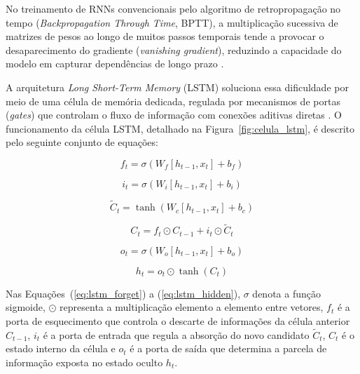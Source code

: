 No treinamento de RNNs convencionais pelo algoritmo de retropropagação no tempo (\textit{Backpropagation Through Time}, BPTT), a multiplicação sucessiva de matrizes de pesos ao longo de muitos passos temporais tende a provocar o desaparecimento do gradiente (\textit{vanishing gradient}), reduzindo a capacidade do modelo em capturar dependências de longo prazo \cite{hochreiter1997long}.

A arquitetura \textit{Long Short-Term Memory} (LSTM) soluciona essa dificuldade por meio de uma célula de memória dedicada, regulada por mecanismos de portas (\textit{gates}) que controlam o fluxo de informação com conexões aditivas diretas \cite{hochreiter1997long}. O funcionamento da célula LSTM, detalhado na Figura~\ref{fig:celula_lstm}, é descrito pelo seguinte conjunto de equações:

\begin{equation}\label{eq:lstm_forget}
f_t = \sigma\left(W_f [h_{t-1}, x_t] + b_f\right)
\end{equation}

\begin{equation}\label{eq:lstm_input}
i_t = \sigma\left(W_i [h_{t-1}, x_t] + b_i\right)
\end{equation}

\begin{equation}\label{eq:lstm_candidate}
\tilde{C}_t = \tanh\left(W_c [h_{t-1}, x_t] + b_c\right)
\end{equation}

\begin{equation}\label{eq:lstm_cell}
C_t = f_t \odot C_{t-1} + i_t \odot \tilde{C}_t
\end{equation}

\begin{equation}\label{eq:lstm_output}
o_t = \sigma\left(W_o [h_{t-1}, x_t] + b_o\right)
\end{equation}

\begin{equation}\label{eq:lstm_hidden}
h_t = o_t \odot \tanh(C_t)
\end{equation}

Nas Equações~(\ref{eq:lstm_forget}) a (\ref{eq:lstm_hidden}), $\sigma$ denota a função sigmoide, $\odot$ representa a multiplicação elemento a elemento entre vetores, $f_t$ é a porta de esquecimento que controla o descarte de informações da célula anterior $C_{t-1}$, $i_t$ é a porta de entrada que regula a absorção do novo candidato $\tilde{C}_t$, $C_t$ é o estado interno da célula e $o_t$ é a porta de saída que determina a parcela de informação exposta no estado oculto $h_t$.


